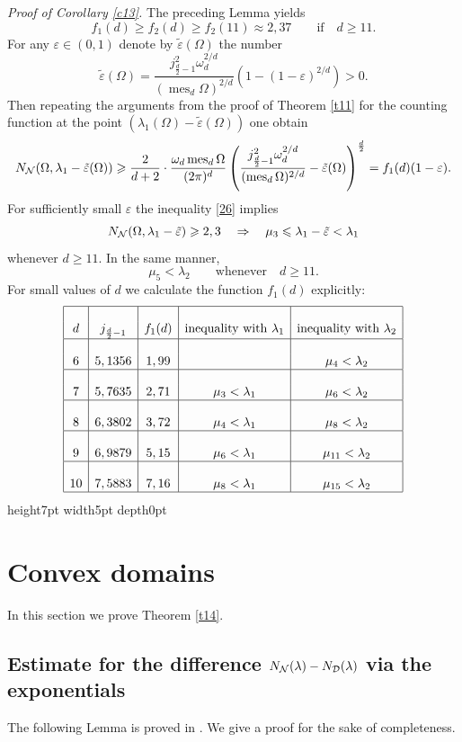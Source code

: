 \documentclass[a4paper,12pt]{article}
\numberwithin{equation}{section}
\def \er{\varepsilon}
\def \la{\lambda}
\def \oo{\omega}
\def \O{\Omega}
\def\mes{\operatorname{mes}}
\newcommand{\<}{\langle}
\renewcommand{\>}{\rangle}
\theoremstyle{plain}
\theoremstyle{definition}
\theoremstyle{remark}
\renewcommand{\le}{\leqslant}
\renewcommand{\ge}{\geqslant}
\renewcommand{\qed}{\vrule height7pt width5pt depth0pt}
\begin{document}
{\it Proof of Corollary \ref{c13}.}
The preceding Lemma yields
\begin{equation}
\label{26}
f_1 (d) \ge f_2 (d) \ge f_2 (11) \approx 2,37 \qquad
\text{if} \quad d \ge 11.
\end{equation}
For any $\er \in (0,1)$ denote by $\tilde \er (\O)$ the number
$$
\tilde \er (\O) =  \frac{j_{\frac{d}2-1}^2 \oo_d^{2/d}}{(\mes_d \O)^{2/d}}
\left(1 - (1-\er)^{2/d}\right) > 0.
$$
Then repeating the arguments from the proof of Theorem \ref{t11} for 
the counting function at the point $(\la_1 (\O) - \tilde \er(\O))$ one obtain
$$
N_{\cal N} (\O, \la_1 - \tilde \er (\O)) 
\ge \frac2{d+2} \cdot \frac{\oo_d \mes_d \O}{(2\pi)^d} 
\left(\frac{j_{\frac{d}2-1}^2 \oo_d^{2/d}}{(\mes_d \O)^{2/d}} - \tilde \er (\O)\right)^{\frac{d}2}
= f_1 (d) (1 - \er).
$$
For sufficiently small $\er$ the inequality \eqref{26} implies
$$
N_{\cal N} (\O, \la_1 - \tilde \er) \ge 2,3 \quad \Rightarrow
\quad \mu_3 \le \la_1 - \tilde \er < \la_1
$$
whenever $d \ge 11$.
In the same manner,
$$
\mu_5 < \la_2 \qquad \text{whenever} \quad d \ge 11.
$$
For small values of $d$ we calculate the function $f_1(d)$ explicitly:
$$
\begin{array}{|c|c|c|c|c|}
\hline
& & & &\\
d & j_{\frac{d}2-1} & f_1(d) & \text{inequality with}\ \la_1 &
\text{inequality with}\ \la_2 \\
\hline
& & & &\\
6 & 5,1356 & 1,99 & & \mu_4 < \la_2 \\
\hline
& & & &\\
7 & 5,7635 & 2,71 & \mu_3 < \la_1 & \mu_6 < \la_2\\
\hline
& & & &\\
8 & 6,3802 & 3,72 & \mu_4 < \la_1 & \mu_8 < \la_2\\
\hline
& & & &\\
9 & 6,9879 & 5,15 & \mu_6 < \la_1 & \mu_{11} < \la_2\\
\hline
& & & &\\
10 & 7,5883 & 7,16 & \mu_8 < \la_1 & \mu_{15} < \la_2\\
\hline
\end{array}
$$
\qed

\section{Convex domains}
In this section we prove Theorem \ref{t14}.

\subsection{Estimate for the difference $N_{\cal N} (\la) - N_{\cal D} (\la)$
via the exponentials}
The following Lemma is proved in \cite{FilSaf}.
We give a proof for the sake of completeness.
\end{document}
